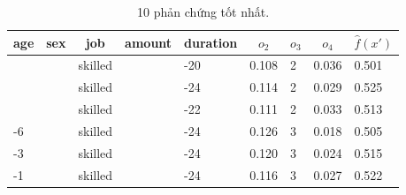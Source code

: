 \begin{table}[hbt!]
\caption{10 phản chứng tốt nhất.}
\centering
\label{tab:german-credit2}
\begin{tabular}{|l|l|l|l|l|l|l|l|l|}
\hline
\multicolumn{1}{|c|}{\textbf{age}} & \multicolumn{1}{c|}{\textbf{sex}} & \multicolumn{1}{c|}{\textbf{job}} & \multicolumn{1}{c|}{\textbf{amount}} & \multicolumn{1}{c|}{\textbf{duration}} & \multicolumn{1}{c|}{\textbf{$o_2$}} & \multicolumn{1}{c|}{\textbf{$o_3$}} & \multicolumn{1}{c|}{\textbf{$o_4$}} & \multicolumn{1}{c|}{\textbf{$\hat{f}(x')$}} \\ \hline
                                   &                                   & skilled                           &                                      & -20                                    & 0.108                          & 2                              & 0.036                          & 0.501                          \\ \hline
                                   &                                   & skilled                           &                                      & -24                                    & 0.114                          & 2                              & 0.029                          & 0.525                          \\ \hline
                                   &                                   & skilled                           &                                      & -22                                    & 0.111                          & 2                              & 0.033                          & 0.513                          \\ \hline
-6                                 &                                   & skilled                           &                                      & -24                                    & 0.126                          & 3                              & 0.018                          & 0.505                          \\ \hline
-3                                 &                                   & skilled                           &                                      & -24                                    & 0.120                          & 3                              & 0.024                          & 0.515                          \\ \hline
-1                                 &                                   & skilled                           &                                      & -24                                    & 0.116                          & 3                              & 0.027                          & 0.522                          \\ \hline

\end{tabular}
\end{table}
